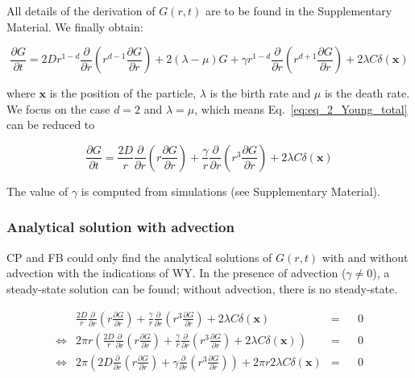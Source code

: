 All details of the derivation of $G(r,t)$ are to be found in the Supplementary Material. We finally obtain:

\begin{equation}
\frac{\partial G}{\partial t}=2Dr^{1-d}\frac{\partial}{\partial r}\left(r^{d-1}\frac{\partial G}{\partial r}\right)+2(\lambda-\mu)G+\gamma r^{1-d}\frac{\partial}{\partial r}\left(r^{d+1}\frac{\partial G}{\partial r}\right)+2\lambda C\delta(\boldsymbol{x})\label{eq:eq_2_Young_total}
\end{equation}

where $\boldsymbol{x}$ is the position of the particle, {\color{blue} $\lambda$ is the birth rate and $\mu$ is the death rate}. \\

We focus on the case $d=2$ and $\lambda=\mu$, which means Eq.~\ref{eq:eq_2_Young_total} can be reduced to

\begin{equation}
\frac{\partial G}{\partial t}=\frac{2D}{r}\frac{\partial}{\partial r}\left(r\frac{\partial G}{\partial r}\right)+\frac{\gamma}{r}\frac{\partial}{\partial r}\left(r^{3}\frac{\partial G}{\partial r}\right)+2\lambda C\delta(\boldsymbol{x})\label{eq:eq_2_Young_reduced}
\end{equation}

The value of $\gamma$ is computed from simulations (see Supplementary Material).

\subsubsection*{Analytical solution with advection}

CP and FB could only find the analytical solutions of $G(r,t)$ with and without advection with the indications of WY. In the presence of advection ($\gamma\neq0$), a steady-state solution
can be found; without advection, there is no steady-state. 

\begin{align}
  &  \frac{2D}{r}\frac{\partial}{\partial r}\left(r\frac{\partial G}{\partial r}\right)+\frac{\gamma}{r}\frac{\partial}{\partial r}\left(r^{3}\frac{\partial G}{\partial r}\right)+2\lambda C\delta(\boldsymbol{x})\nonumber & = & & 0 \\
\Leftrightarrow & 2\pi r\left(\frac{2D}{r}\frac{\partial}{\partial r}\left(r\frac{\partial G}{\partial r}\right)+\frac{\gamma}{r}\frac{\partial}{\partial r}\left(r^{3}\frac{\partial G}{\partial r}\right)+2\lambda C\delta(\boldsymbol{x})\right)\nonumber & = & & 0 \\
 \Leftrightarrow  & 2\pi\left(2D\frac{\partial}{\partial r}\left(r\frac{\partial G}{\partial r}\right)+\gamma\frac{\partial}{\partial r}\left(r^{3}\frac{\partial G}{\partial r}\right)\right)+2\pi r2\lambda C\delta(\boldsymbol{x}) & = & & 0\label{eq:steady_state}
\end{align}

